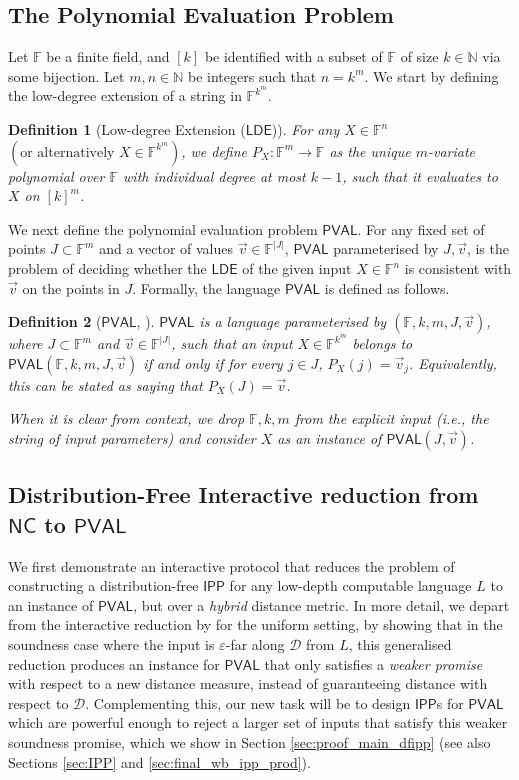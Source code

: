 \documentclass[11pt]{article}
\newtheorem{definition}{Definition}[section]
\newcommand{\NC}{\mathsf{NC}}
\newcommand{\PVAL}{\mathsf{PVAL}}
\newcommand{\IPP}{\mathsf{IPP}}
\newcommand{\LDE}{\mathsf{LDE}}
\newcommand{\F}{\mathbb{F}}
\newcommand{\N}{\mathbb{N}}
\newcommand{\sD}{\mathcal{D}}
\begin{document}
\subsection{The Polynomial Evaluation Problem}
\label{sec:pval_def}
Let $\F$ be a finite field, and $[k]$ be identified with a subset of $\F$ of size $k\in \N$ via some bijection. Let $m,n \in \N$ be integers such that $n=k^{m}$. We start by defining the low-degree extension of a string in $\F^{k^m}$.
\begin{definition}[Low-degree Extension ($\LDE$)]
\label{def:lde}
For any $X \in \F^n$ $\left( \text{or alternatively } X \in \F^{k^{m}} \right)$, we define $P_X : \F^m \rightarrow \F$ as the unique $m$-variate polynomial over $\F$ with individual degree at most $k - 1$, such that it evaluates to $X$ on $[k]^{m}$.
\end{definition}

We next define the polynomial evaluation problem $\PVAL$. For any fixed set of points $J \subset \F^m$ and a vector of values $\Vec{v} \in \F^{\vert J \vert}$, $\PVAL$ parameterised by $J,\Vec{v}$, is the problem of deciding whether the $\LDE$ of the given input $X \in \F^n$ is consistent with $\Vec{v}$ on the points in $J$. Formally, the language $\PVAL$ is defined as follows.

\begin{definition}[$\PVAL$, \cite{RVW}]
\label{def:pval}
$\PVAL$ is a language parameterised by $(\F,k,m,J,\Vec{v})$, where $J \subset \F^m$ and $\Vec{v} \in \F^{\vert J \vert}$, such that an input $X \in \F^{k^m}$ belongs to $\PVAL(\F,k,m,J,\Vec{v})$ if and only if for every $j\in J$, $P_X(j)=\vec{v}_{j}$. Equivalently, this can be stated as saying that $P_X(J) = \Vec{v}$. 

When it is clear from context, we drop $\F,k,m$ from the explicit input (i.e., the string of input parameters) and consider $X$ as an instance of $\PVAL(J,\Vec{v})$.
\end{definition}

\subsection{Distribution-Free Interactive reduction from \texorpdfstring{$\NC$}{} to \texorpdfstring{$\PVAL$}{}}
\label{sec:NCPVAL}
We first demonstrate an interactive protocol that reduces the problem of constructing a distribution-free $\IPP$ for any low-depth computable language $L$ to an instance of $\PVAL$, but over a \textit{hybrid} distance metric. In more detail, we depart from the interactive reduction by \cite{RVW} for the uniform setting, by showing that in the soundness case where the input is $\varepsilon$-far along $\sD$ from $L$, this generalised reduction produces an instance for $\PVAL$ that only satisfies a \textit{weaker promise} with respect to a new distance measure, instead of guaranteeing distance with respect to $\sD$. Complementing this, our new task will be to design $\IPP$s for $\PVAL$ which are powerful enough to reject a larger set of inputs that satisfy this weaker soundness promise, which we show in Section \ref{sec:proof_main_dfipp} (see also Sections \ref{sec:IPP} and \ref{sec:final_wb_ipp_prod}).
\end{document}
